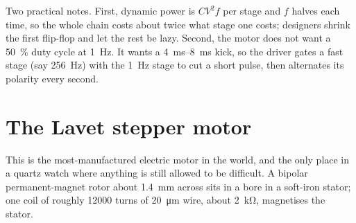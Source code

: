 \documentclass[11pt,a4paper]{article}
\begin{document}
Two practical notes. First, dynamic power is $CV^2 f$ per stage and $f$ halves each time, so
the whole chain costs about twice what stage one costs; designers shrink the first flip-flop
and let the rest be lazy. Second, the motor does not want a \SI{50}{\percent} duty cycle at
\SI{1}{\hertz}. It wants a \SIrange{4}{8}{\milli\second} kick, so the driver gates a fast stage
(say \SI{256}{\hertz}) with the \SI{1}{\hertz} stage to cut a short pulse, then alternates its
polarity every second.

\section{The Lavet stepper motor}

This is the most-manufactured electric motor in the world, and the only place in a quartz watch
where anything is still allowed to be difficult. A bipolar permanent-magnet rotor about
\SI{1.4}{\milli\metre} across sits in a bore in a soft-iron stator; one coil of roughly
\num{12000} turns of \SI{20}{\micro\metre} wire, about \SI{2}{\kilo\ohm}, magnetises the stator.
\end{document}
